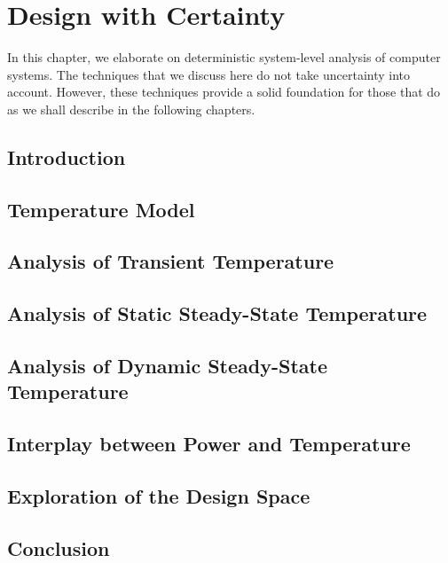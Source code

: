\chapter{Design with Certainty}
\newcommand{\inputsection}[1]{}

In this chapter, we elaborate on deterministic system-level analysis of computer
systems. The techniques that we discuss here do not take uncertainty into
account. However, these techniques provide a solid foundation for those that do
as we shall describe in the following chapters.

\section{Introduction}
\inputsection{introduction}

\section{Temperature Model}
\inputsection{temperature-model}

\section{Analysis of Transient Temperature}
\inputsection{transient-analysis}

\section{Analysis of Static Steady-State Temperature}
\inputsection{static-steady-state-analysis}

\section{Analysis of Dynamic Steady-State Temperature}
\inputsection{dynamic-steady-state-analysis}

\section{Interplay between Power and Temperature}
\inputsection{power-temperature-interplay}

\section{Exploration of the Design Space}
\inputsection{design-space-exploration}

\section{Conclusion}
\inputsection{conclusion}
